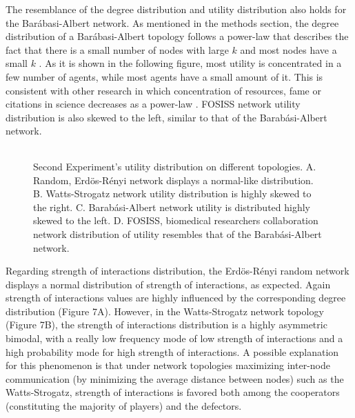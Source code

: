 \documentclass{bmcart}
\def\texttt{[image: ]}
\begin{document}
The resemblance of the degree distribution and utility distribution also holds
for the Bar\'abasi-Albert network. As mentioned in the methods section, the
degree distribution of a Bar\'abasi-Albert topology follows a power-law that
describes the fact that there is a small number of nodes with large $k$ and most
nodes have a small $k$ \cite{BarabasiAlbert:99}. As it is shown in the following
figure, most utility is concentrated in a few number of agents, while most
agents have a small amount of it. This is consistent with other research in
which concentration of resources, fame or citations in science decreases as a
power-law \cite{Simon:55,Price:1965,Merton:1968}. FOSISS network utility
distribution is also skewed to the left, similar to that of the
Barab\'asi-Albert network. \\ 


\begin{figure} [h!]
\centering
\begin{tabular}{cc}

\end{tabular}
\caption{Second Experiment's utility distribution on different topologies. A. Random,
  Erd\"{o}s-R\'enyi network displays a normal-like
  distribution. B. Watts-Strogatz network utility distribution is highly skewed
  to the right. C. Barab\'asi-Albert network utility is distributed highly
  skewed to the left. D. FOSISS, biomedical researchers collaboration network
  distribution of utility resembles that of the Barab\'asi-Albert
  network.}\label{histo_fitness} 
\end{figure}


Regarding strength of interactions distribution, the Erd\"{o}s-R\'enyi random
network displays a normal distribution of strength of interactions, as
expected. Again strength of interactions values are highly influenced by the
corresponding degree distribution (Figure 7A). However, in the Watts-Strogatz
network topology (Figure 7B), the strength of interactions distribution is a
highly asymmetric bimodal, with a really low frequency mode of low strength of
interactions and a high probability mode for high strength of interactions. A
possible explanation for this phenomenon is that under network topologies
maximizing inter-node communication (by minimizing the average distance between
nodes) such as the Watts-Strogatz, strength of interactions is favored both
among the cooperators (constituting the majority of players) and the
defectors. \\ 
\end{document}
